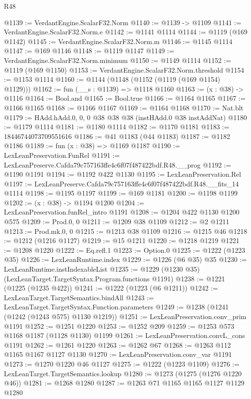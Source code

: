 \begin{lexlean}{R48}
\begin{coremodule}
@1139 := VerdantEngine.ScalarF32.Norm
@1140 := @1139 -> @1109
@1141 := VerdantEngine.ScalarF32.Norm.e
@1142 := @1141 @1114
@1144 := @1119 (@169 @1142)
@1145 := VerdantEngine.ScalarF32.Norm.m
@1146 := @1145 @1114
@1147 := @169 @1146
@1148 := @1119 @1147
@1149 := VerdantEngine.ScalarF32.Norm.minimum
@1150 := @1149 @1114
@1152 := @1119 (@169 @1150)
@1153 := VerdantEngine.ScalarF32.Norm.threshold
@1154 := @1153 @1114
@1160 := @1144 (@1148 (@1152 (@1119 (@169 @1154) @1129)))
@1162 := fun (__s : @1139) => @1118 @1160
@1163 := (x : @38) -> @1116
@1164 := Bool.and
@1165 := Bool.true
@1166 := @1164 @1165
@1167 := @1166 @1165
@1168 := @1166 @1167
@1169 := @1164 @1168
@1170 := Nat.blt
@1179 := HAdd.hAdd.{0, 0, 0} @38 @38 @38 (instHAdd.{0} @38 instAddNat)
@1180 := @1179 @1114
@1181 := @1180 @1114
@1182 := @1170 @1181
@1183 := 18446744073709551616
@1186 := @41 @1183 (@44 @1183)
@1187 := @1182 @1186
@1189 := fun (x : @38) => @1169 @1187
@1190 := LexLeanPreservation.FunRel
@1191 := LexLeanPreserve.Cafda79c757163ffe4c6f07f487422bdf.R48.__prog
@1192 := @1190 @1191
@1194 := @1192 @422 @1130
@1195 := LexLeanPreservation.Rel
@1197 := LexLeanPreserve.Cafda79c757163ffe4c6f07f487422bdf.R48.__fits_14 @1114
@1198 := @1195 @1197
@1199 := @169 @1181
@1200 := @1198 @1199
@1202 := (x : @38) -> @1194 @1200
@1204 := LexLeanPreservation.funRel_intro @1191
@1208 := @1204 @422 @1130 @1200 @575
@1209 := Prod.{0, 0}
@1211 := @1209 @38 @1109
@1212 := @2 @1211
@1213 := Prod.mk.{0, 0}
@1215 := @1213 @38 @1109
@1216 := @1215 @46
@1218 := @1212 (@1216 @1127)
@1219 := @15 @1211
@1220 := @1218 @1219
@1221 := @1208 @1220
@1222 := Eq.refl.{1}
@1223 := Option.{0}
@1225 := @1222 (@1223 @35)
@1226 := LexLeanRuntime.index
@1229 := @1226 (@6 @35) @35
@1230 := LexLeanRuntime.instIndexableList
@1235 := @1229 (@1230 @35) (LexLeanTarget.TargetSyntax.Program.functions @1191)
@1238 := @1221 (@1225 (@1235 @422))
@1241 := @1222 (@1223 (@6 @1211))
@1242 := LexLeanTarget.TargetSemantics.bindAll
@1243 := LexLeanTarget.TargetSyntax.Function.parameters
@1249 := @1238 (@1241 (@1242 (@1243 @575) @1130 @1219))
@1251 := LexLeanPreservation.conv_prim @1191
@1252 := @1251 @1220
@1253 := @1252 @209
@1259 := @1253 @573 @1168 @1187 (@1128 @1130) @1199
@1261 := LexLeanPreservation.convL_cons @1191
@1262 := @1261 @1220
@1263 := @1262 @67
@1268 := @1263 @112 @1165 @1167 @1127 @1130
@1270 := LexLeanPreservation.conv_var @1191
@1273 := @1270 @1220 @46 @1127
@1275 := @1222 (@1223 @1109)
@1276 := LexLeanTarget.TargetSemantics.lookup
@1280 := @1273 (@1275 (@1276 @1220 @46))
@1281 := @1268 @1280
@1287 := @1263 @71 @1165 @1165 @1127 @1129 @1280

\end{coremodule}
\end{lexlean}
